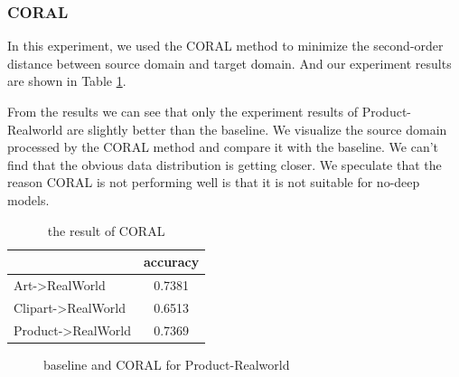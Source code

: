 \documentclass[conference]{IEEEtran}
\begin{document}
\subsubsection{CORAL}
In this experiment, we used the CORAL method to minimize the second-order distance between source domain and target domain. And our experiment results are shown in Table \ref{tab:CORAL}.\par
From the results we can see that only the experiment results of Product-Realworld are slightly better than the baseline. We visualize the source domain processed by the CORAL method and compare it with the baseline. We can't find that the obvious data distribution is getting closer. We speculate that the reason CORAL is not performing well is that it is not suitable for no-deep models.
\begin{table}[H]
	\centering
	\caption{the result of CORAL}
\begin{tabular}{|l|c|}
	\hline
	\diagbox{dataset}{result} & accuracy \\
	\hline
	Art->RealWorld & 0.7381 \\
	\hline
	Clipart->RealWorld & 0.6513 \\
	\hline
	Product->RealWorld & 0.7369 \\
	\hline
\end{tabular}\label{tab:CORAL}
\end{table}

\begin{center}
	\begin{figure}[H]
		\centering
		\quad
		\caption{baseline and CORAL for Product-Realworld}
		\label{fig:CORAL}
	\end{figure}
\end{center}
\end{document}
